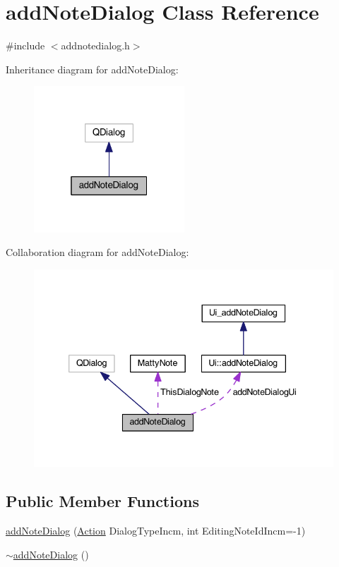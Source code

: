\hypertarget{classaddNoteDialog}{}\section{add\+Note\+Dialog Class Reference}
\label{classaddNoteDialog}


{\ttfamily \#include $<$addnotedialog.\+h$>$}



Inheritance diagram for add\+Note\+Dialog\+:
\nopagebreak
\begin{figure}[H]
\begin{center}
\leavevmode
\includegraphics[width=160pt]{classaddNoteDialog__inherit__graph}
\end{center}
\end{figure}


Collaboration diagram for add\+Note\+Dialog\+:
\nopagebreak
\begin{figure}[H]
\begin{center}
\leavevmode
\includegraphics[width=339pt]{classaddNoteDialog__coll__graph}
\end{center}
\end{figure}
\subsection*{Public Member Functions}
\begin{DoxyCompactItemize}
\item 
\hyperlink{classaddNoteDialog_a39bdf3974bd9d583959015b40205e3f5}{add\+Note\+Dialog} (\hyperlink{addnotedialog_8h_a8bb1ef53467e4f61410d12822d922498}{Action} Dialog\+Type\+Incm, int Editing\+Note\+Id\+Incm=-\/1)
\item 
\hyperlink{classaddNoteDialog_a900c8ab72a54252fa03299d821af644f}{$\sim$add\+Note\+Dialog} ()
\end{DoxyCompactItemize}
